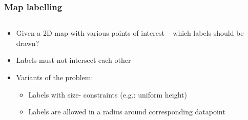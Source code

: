\documentclass{beamer}
\begin{document}
\begin{frame}
\frametitle{Map labelling}
 \begin{columns}[T]
    \begin{column}{.5\textwidth}
\begin{itemize}
\item<1-> Given a 2D map with various points of interest -- which labels should be drawn?
\item<3-> Labels must not intersect each other 
\item<4-> Variants of the problem:
\begin{itemize}
\item Labels with size- constraints (e.g.: uniform height)
\item Labels are allowed in a radius around corresponding datapoint
\end{itemize}
\end{itemize}
    \end{column}
    \begin{column}{.5\textwidth}
    {
    }
    \end{column}
  \end{columns}
\end{frame}
\end{document}
